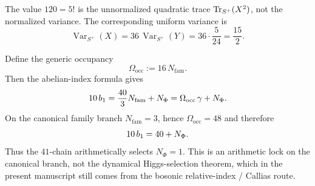 \begin{remark}
The value $120=5!$ is the unnormalized quadratic trace $\operatorname{Tr}_{S^+}(X^2)$, not the normalized variance. The corresponding uniform variance is
\[
\operatorname{Var}_{S^+}(X)=36\,\operatorname{Var}_{S^+}(Y)=36\cdot\frac{5}{24}=\frac{15}{2}.
\]
\end{remark}

\begin{remark}
Define the generic occupancy
\[
\Omega_{\mathrm{occ}}:=16\,N_{\mathrm{fam}}.
\]
Then the abelian-index formula gives
\[
10\,b_1
=
\frac{40}{3}N_{\mathrm{fam}}+N_\Phi
=
\Omega_{\mathrm{occ}}\,\gamma+N_\Phi.
\]
On the canonical family branch $N_{\mathrm{fam}}=3$, hence $\Omega_{\mathrm{occ}}=48$ and therefore
\[
10\,b_1=40+N_\Phi.
\]
Thus the $41$-chain arithmetically selects $N_\Phi=1$. This is an arithmetic lock on the canonical branch, not the dynamical Higgs-selection theorem, which in the present manuscript still comes from the bosonic relative-index / Callias route.
\end{remark}

